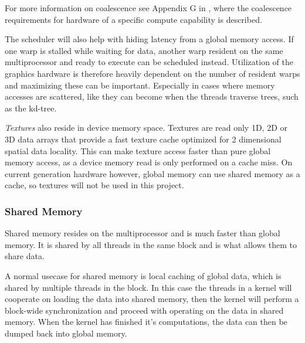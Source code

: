 For more information on coalescence see Appendix G in
, where the coalescence requirements for hardware of
a specific compute capability is described.


The scheduler will also help with hiding latency from a global memory
access. If one warp is stalled while waiting for data, another warp
resident on the same multiprocessor and ready to execute can be
scheduled instead. Utilization of the graphics hardware is therefore
heavily dependent on the number of resident warps and maximizing these
can be important. Especially in cases where memory accesses are
scattered, like they can become when the threads traverse trees, such
as the kd-tree.


\textit{Textures} also reside in device memory space. Textures are
read only 1D, 2D or 3D data arrays that provide a fast texture cache
optimized for 2 dimensional spatial data locality. This can make
texture access faster than pure global memory access, as a device
memory read is only performed on a cache miss. On current generation
hardware however, global memory can use shared memory as a cache, so
textures will not be used in this project.

\subsubsection{Shared Memory}


Shared memory resides on the multiprocessor and is much faster than
global memory. It is shared by all threads in the same block and is
what allows them to share data.


A normal usecase for shared memory is local caching of global data,
which is shared by multiple threads in the block. In this case the
threads in a kernel will cooperate on loading the data into shared
memory, then the kernel will perform a block-wide synchronization and
proceed with operating on the data in shared memory. When the kernel
has finished it's computations, the data can then be dumped back into
global memory.


